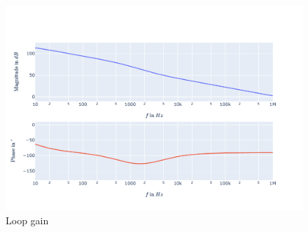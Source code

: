 %
\begin{figure}
  \centering
  \includegraphics[height=\largeheight]{src/assets/pictures/circuit/amp_stability.pdf}
  \caption{Loop gain}\label{fig:pcb:amp:stab:loop_gain}
\end{figure}
%